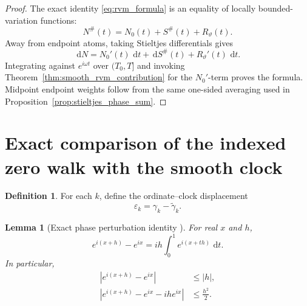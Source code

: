 \documentclass[11pt]{amsart}
\numberwithin{equation}{section}
\theoremstyle{plain}
\newtheorem{lemma}[theorem]{Lemma}
\theoremstyle{definition}
\newtheorem{definition}[theorem]{Definition}
\theoremstyle{remark}
\newcommand{\1}{\mathbf{1}}
\newcommand{\dd}{\,\mathrm{d}}
\begin{document}
\begin{proof}
The exact identity \eqref{eq:rvm_formula} is an equality of locally
bounded-variation functions:
\begin{equation}
N^{\#}(t)=N_0(t)+S^{\#}(t)+R_\vartheta(t).
\label{eq:rvm_linear_decomposition_proof}
\end{equation}
Away from endpoint atoms, taking Stieltjes differentials gives
\begin{equation}
\dd N
=
N_0'(t)\,\dd t+\dd S^{\#}(t)+R_\vartheta'(t)\,\dd t.
\label{eq:rvm_differential_decomposition}
\end{equation}
Integrating against \(e^{i\omega t}\) over \((T_0,T]\) and invoking
Theorem~\ref{thm:smooth_rvm_contribution} for the \(N_0'\)-term proves
the formula.  Midpoint endpoint weights follow from the same one-sided
averaging used in Proposition~\ref{prop:stieltjes_phase_sum}.
\end{proof}

\section{Exact comparison of the indexed zero walk with the smooth clock}
\label{sec:indexed_rvm_comparison}

\begin{definition}
\label{def:index_displacement}
For each \(k\), define the ordinate--clock displacement
\begin{equation}
\varepsilon_k
=
\gamma_k-\widetilde\gamma_k.
\label{eq:index_displacement}
\end{equation}
\end{definition}


\begin{lemma}[Exact phase perturbation identity {}]
\label{lem:phase_perturbation}
For real \(x\) and \(h\),
\begin{equation}
e^{i(x+h)}-e^{ix}
=
ih\int_0^1e^{i(x+th)}\,\dd t.
\label{eq:phase_perturbation_integral}
\end{equation}
In particular,
\begin{align}
|e^{i(x+h)}-e^{ix}|
&\leq |h|,
\label{eq:phase_lipschitz}
\\
\left|e^{i(x+h)}-e^{ix}-ihe^{ix}\right|
&\leq\frac{h^2}{2}.
\label{eq:phase_quadratic_remainder}
\end{align}
\end{lemma}
\end{document}
